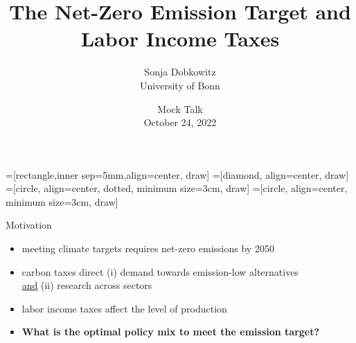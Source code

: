 \documentclass[11pt,aspectratio=169]{beamer}
\author[Sonja Dobkowitz]{\small Sonja Dobkowitz\\ \footnotesize{University of Bonn%
	}\\ }
\title{The Net-Zero Emission Target and Labor Income Taxes}
\date{\small{Mock Talk\\ October 24, 2022 }}
\begin{document}
	
	=[rectangle,inner sep=5mm,align=center, draw]
	=[diamond, align=center, draw]
	=[circle, align=center, dotted, minimum size=3cm, draw]
	=[circle, align=center, minimum size=3cm, draw]
	{
		\begin{frame}
		\titlepage
	\end{frame}
}



\addtocounter{framenumber}{-1}
\begin{frame}{Motivation}

\begin{itemize}[<+-| alert@+>]
	\item meeting climate targets requires net-zero emissions by 2050 \citep{IPCC2022}
\vspace{3mm}
	\item carbon taxes  direct  (i) demand towards emission-low alternatives\\ \hspace{23mm} \underline{and} (ii) research across sectors
	\vspace{3mm}
	\item labor income taxes affect the level of production 
	\vspace{3mm}
\item \textbf{What is the optimal policy mix to meet the emission target?}
\end{itemize}
\end{frame}
\end{document}
